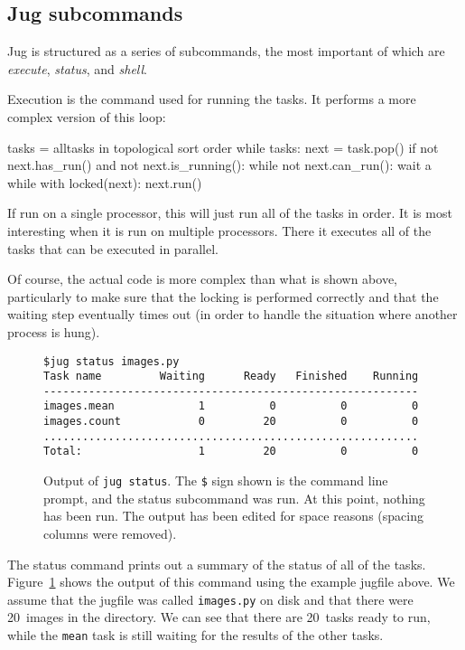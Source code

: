 \documentclass{article}
\let\code\texttt
\begin{document}
\subsection{Jug subcommands}

Jug is structured as a series of subcommands, the most important of which are
\emph{execute}, \emph{status}, and \emph{shell}.

Execution is the command used for running the tasks. It performs a more complex
version of this loop:

\begin{python}
tasks = alltasks in topological sort order
while tasks:
    next = task.pop()
    if not next.has_run() and not next.is_running():
        while not next.can_run():
            wait a while
        with locked(next):
            next.run()
\end{python}

If run on a single processor, this will just run all of the tasks in order. It
is most interesting when it is run on multiple processors. There it executes
all of the tasks that can be executed in parallel.

Of course, the actual code is more complex than what is shown above,
particularly to make sure that the locking is performed correctly and that the
waiting step eventually times out (in order to handle the situation where
another process is hung).

\begin{figure}
\begin{verbatim}
$jug status images.py
Task name         Waiting      Ready   Finished    Running
----------------------------------------------------------
images.mean             1          0          0          0
images.count            0         20          0          0
..........................................................
Total:                  1         20          0          0
\end{verbatim}
\caption{Output of \code{jug status}. The \texttt{\$} sign shown is the command
line prompt, and the status subcommand was run. At this point, nothing has been
run. The output has been edited for space reasons (spacing columns were
removed).}
\label{fig:jug-status-output}
\end{figure}

The status command prints out a summary of the status of all of the tasks.
Figure~\ref{fig:jug-status-output} shows the output of this command using the
example jugfile above. We assume that the jugfile was called \code{images.py}
on disk and that there were 20~images in the directory. We can see that there
are 20~tasks ready to run, while the \code{mean} task is still waiting for the
results of the other tasks.
\end{document}
